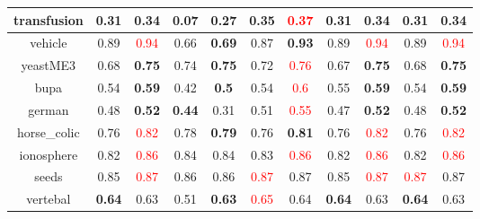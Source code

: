 \documentclass{article}%
\begin{document}
\begin{tabular}{c|cccccccccc}
\hline%
transfusion&0.31&\textbf{0.34}&0.07&\textbf{0.27}&0.35&\textcolor{red}{ 
0.37
}&0.31&\textbf{0.34}&0.31&\textbf{0.34}\\%
\hline%
vehicle&0.89&\textcolor{red}{ 
0.94
}&0.66&\textbf{0.69}&0.87&\textbf{0.93}&0.89&\textcolor{red}{ 
0.94
}&0.89&\textcolor{red}{ 
0.94
}\\%
\hline%
yeastME3&0.68&\textbf{0.75}&0.74&\textbf{0.75}&0.72&\textcolor{red}{ 
0.76
}&0.67&\textbf{0.75}&0.68&\textbf{0.75}\\%
\hline%
bupa&0.54&\textbf{0.59}&0.42&\textbf{0.5}&0.54&\textcolor{red}{ 
0.6
}&0.55&\textbf{0.59}&0.54&\textbf{0.59}\\%
\hline%
german&0.48&\textbf{0.52}&\textbf{0.44}&0.31&0.51&\textcolor{red}{ 
0.55
}&0.47&\textbf{0.52}&0.48&\textbf{0.52}\\%
\hline%
horse\_colic&0.76&\textcolor{red}{ 
0.82
}&0.78&\textbf{0.79}&0.76&\textbf{0.81}&0.76&\textcolor{red}{ 
0.82
}&0.76&\textcolor{red}{ 
0.82
}\\%
\hline%
ionosphere&0.82&\textcolor{red}{ 
0.86
}&0.84&0.84&0.83&\textcolor{red}{ 
0.86
}&0.82&\textcolor{red}{ 
0.86
}&0.82&\textcolor{red}{ 
0.86
}\\%
\hline%
seeds&0.85&\textcolor{red}{ 
0.87
}&0.86&0.86&\textcolor{red}{ 
0.87
}&0.87&0.85&\textcolor{red}{ 
0.87
}&\textcolor{red}{ 
0.87
}&0.87\\%
\hline%
vertebal&\textbf{0.64}&0.63&0.51&\textbf{0.63}&\textcolor{red}{ 
0.65
}&0.64&\textbf{0.64}&0.63&\textbf{0.64}&0.63\\%
\hline%
\end{tabular}

%
\end{document}
